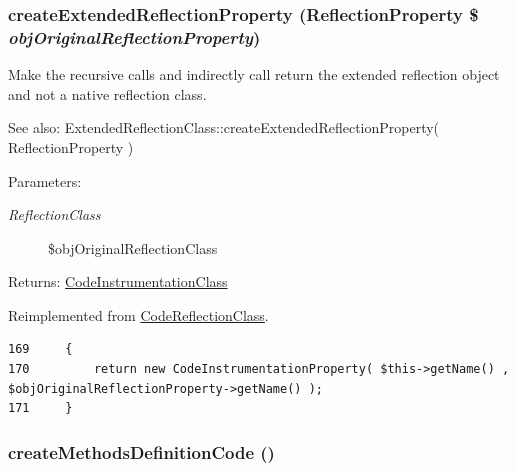 \hypertarget{class_code_instrumentation_class_bce271bf4f7b77b8b11986404241ab5c}{
\subsubsection[{createExtendedReflectionProperty}]{\setlength{\rightskip}{0pt plus 5cm}createExtendedReflectionProperty (ReflectionProperty \$ {\em objOriginalReflectionProperty})}}
\label{class_code_instrumentation_class_bce271bf4f7b77b8b11986404241ab5c}


Make the recursive calls and indirectly call return the extended reflection object and not a native reflection class.

\begin{Desc}
\item[See also:]ExtendedReflectionClass::createExtendedReflectionProperty( ReflectionProperty ) \end{Desc}
\begin{Desc}
\item[Parameters:]
\begin{description}
\item[{\em ReflectionClass}]\$objOriginalReflectionClass \end{description}
\end{Desc}
\begin{Desc}
\item[Returns:]\hyperlink{class_code_instrumentation_class}{CodeInstrumentationClass} \end{Desc}


Reimplemented from \hyperlink{class_code_reflection_class_bce271bf4f7b77b8b11986404241ab5c}{CodeReflectionClass}.

\begin{Code}\begin{verbatim}169     {
170         return new CodeInstrumentationProperty( $this->getName() , $objOriginalReflectionProperty->getName() );
171     }
\end{verbatim}
\end{Code}


\hypertarget{class_code_instrumentation_class_c2d23f8614e24561b794d5031001eaf8}{
\subsubsection[{createMethodsDefinitionCode}]{\setlength{\rightskip}{0pt plus 5cm}createMethodsDefinitionCode ()}}
\label{class_code_instrumentation_class_c2d23f8614e24561b794d5031001eaf8}


